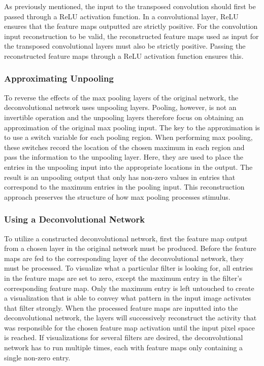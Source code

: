 \noindent As previously mentioned, the input to the transposed convolution should first be passed through a ReLU activation function. In a convolutional layer, ReLU ensures that the feature maps outputted are strictly positive. For the convolution input reconstruction to be valid, the reconstructed feature maps used as input for the transposed convolutional layers must also be strictly positive. Passing the reconstructed feature maps through a ReLU activation function ensures this.

\subsubsection{Approximating Unpooling}

To reverse the effects of the max pooling layers of the original network, the deconvolutional network uses unpooling layers. Pooling, however, is not an invertible operation and the unpooling layers therefore focus on obtaining an approximation of the original max pooling input. The key to the approximation is to use a switch variable for each pooling region. When performing max pooling, these switches record the location of the chosen maximum in each region and pass the information to the unpooling layer. Here, they are used to place the entries in the unpooling input into the appropriate locations in the output. The result is an unpooling output that only has non-zero values in entries that correspond to the maximum entries in the pooling input. This reconstruction approach preserves the structure of how max pooling processes stimulus. 

\subsubsection{Using a Deconvolutional Network}

To utilize a constructed deconvolutional network, first the feature map output from a chosen layer in the original network must be produced. Before the feature maps are fed to the corresponding layer of the deconvolutional network, they must be processed. To visualize what a particular filter is looking for, all entries in the feature maps are set to zero, except the maximum entry in the filter's corresponding feature map. Only the maximum entry is left untouched to create a visualization that is able to convey what pattern in the input image activates that filter strongly. When the processed feature maps are inputted into the deconvolutional network, the layers will successively reconstruct the activity that was responsible for the chosen feature map activation until the input pixel space is reached. If visualizations for several filters are desired, the deconvolutional network has to run multiple times, each with feature maps only containing a single non-zero entry. 

